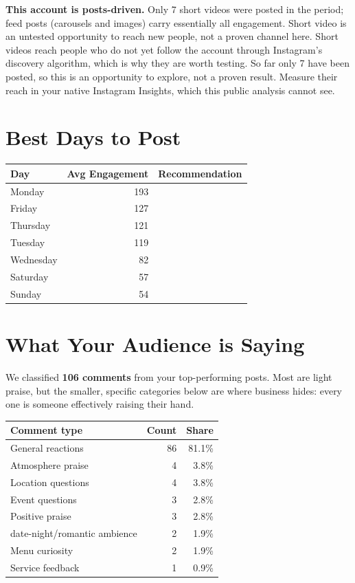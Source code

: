 \documentclass[11pt,a4paper]{article}
\begin{document}
\textbf{This account is posts-driven.} Only 7 short videos were posted in the period; feed posts (carousels and images) carry essentially all engagement. Short video is an untested opportunity to reach new people, not a proven channel here.
Short videos reach people who do not yet follow the account through Instagram's discovery algorithm, which is why they are worth testing. So far only 7 have been posted, so this is an opportunity to explore, not a proven result. Measure their reach in your native Instagram Insights, which this public analysis cannot see.

\section*{\color{tregreen}Best Days to Post}

\begin{center}
\begin{tabular}{lrc}
\toprule
\textbf{Day} & \textbf{Avg Engagement} & \textbf{Recommendation} \\
\midrule
Monday & 193 \\
Friday & 127 \\
Thursday & 121 \\
Tuesday & 119 \\
Wednesday & 82 \\
Saturday & 57 \\
Sunday & 54 \\
\bottomrule
\end{tabular}
\end{center}

\section*{\color{tregreen}What Your Audience is Saying}

We classified \textbf{106 comments} from your top-performing posts.
Most are light praise, but the smaller, specific categories below are where business hides: every one is someone effectively raising their hand.

\begin{center}
\begin{tabular}{lrr}
\toprule
\textbf{Comment type} & \textbf{Count} & \textbf{Share} \\
\midrule
General reactions & 86 & 81.1\% \\
Atmosphere praise & 4 & 3.8\% \\
Location questions & 4 & 3.8\% \\
Event questions & 3 & 2.8\% \\
Positive praise & 3 & 2.8\% \\
date-night/romantic ambience & 2 & 1.9\% \\
Menu curiosity & 2 & 1.9\% \\
Service feedback & 1 & 0.9\% \\
\bottomrule
\end{tabular}
\end{center}
\end{document}
